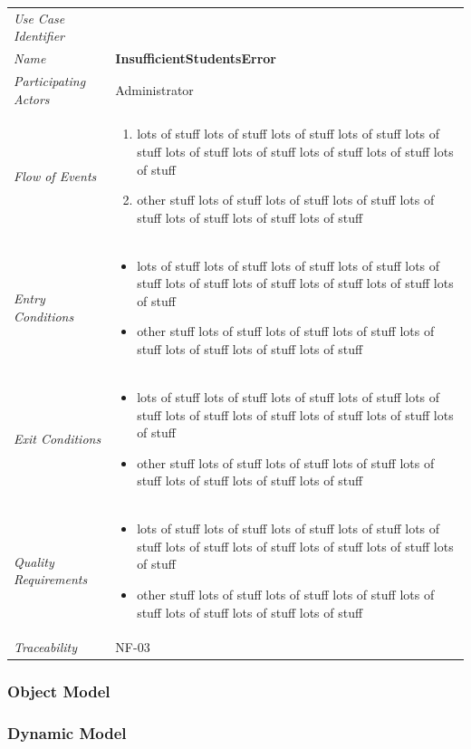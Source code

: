 \documentclass[12pt,letterpaper]{article}
\begin{document}
\begin{center}
	\begin{tabu} to 
		\toprule
		Use Case Identifier & \insufficientstudentserror{} \\
		Name & {\bf InsufficientStudentsError} \\
		Participating Actors & Administrator \\
		Flow of Events & 
	    \begin{enumerate}[topsep=-1em]
		    \item lots of stuff lots of stuff lots of stuff lots of stuff lots of stuff lots of stuff lots of stuff lots of stuff lots of stuff lots of stuff
		    \item other stuff lots of stuff lots of stuff lots of stuff lots of stuff lots of stuff lots of stuff lots of stuff
		\end{enumerate} \\

		Entry Conditions &
		\begin{itemize}[topsep=-1em]
		    \item lots of stuff lots of stuff lots of stuff lots of stuff lots of stuff lots of stuff lots of stuff lots of stuff lots of stuff lots of stuff
		    \item other stuff lots of stuff lots of stuff lots of stuff lots of stuff lots of stuff lots of stuff lots of stuff
        \end{itemize} \\

		Exit Conditions &
		\begin{itemize}[topsep=-1em]
		    \item lots of stuff lots of stuff lots of stuff lots of stuff lots of stuff lots of stuff lots of stuff lots of stuff lots of stuff lots of stuff
		    \item other stuff lots of stuff lots of stuff lots of stuff lots of stuff lots of stuff lots of stuff lots of stuff
        \end{itemize} \\

		Quality Requirements &
		\begin{itemize}[topsep=-1em]
		    \item lots of stuff lots of stuff lots of stuff lots of stuff lots of stuff lots of stuff lots of stuff lots of stuff lots of stuff lots of stuff
		    \item other stuff lots of stuff lots of stuff lots of stuff lots of stuff lots of stuff lots of stuff lots of stuff
        \end{itemize} \\

		Traceability & NF-03 \\
		\toprule
	\end{tabu}
\end{center}

\subsubsection{Object Model}


\subsubsection{Dynamic Model}
\end{document}
